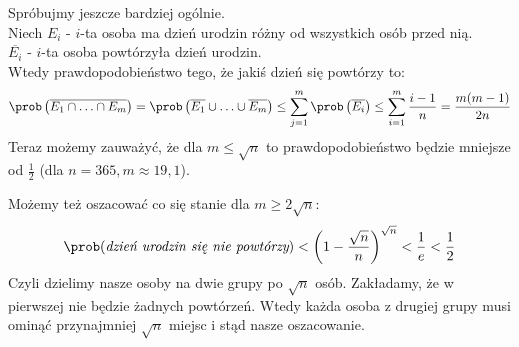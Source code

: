 \begin{example}
	Spróbujmy jeszcze bardziej ogólnie.\\
	Niech \( E_i \) - \(i\)-ta osoba ma dzień urodzin różny od wszystkich osób przed nią.\\
	\( \overline{E_i} \) - \(i\)-ta osoba powtórzyła dzień urodzin.\\
	Wtedy prawdopodobieństwo tego, że jakiś dzień się powtórzy to:
	\[
		\prob\left( \overline{E_1 \cap \ldots \cap E_m } \right) = \prob\left( \overline{E_1} \cup \ldots \cup \overline{E_m} \right) \leq \sum_{j = 1}^{m}\prob\left( \overline{E_i} \right) \leq \sum_{i = 1}^{m}\frac{i-1}{n} = \frac{m(m-1)}{2n}
	\]
	Teraz możemy zauważyć, że dla \( m \leq \sqrt{n} \) to prawdopodobieństwo będzie mniejsze od \( \frac{1}{2} \) (dla \( n = 365, m \approx 19,1 \)).

	Możemy też oszacować co się stanie dla \( m \geq 2\sqrt{n} \):
	\[
		\prob(\textit{dzień urodzin się nie powtórzy}) < \left( 1 - \frac{\sqrt{n}}{n} \right)^{\sqrt{n}} < \frac{1}{e} < \frac{1}{2}
	\]
	Czyli dzielimy nasze osoby na dwie grupy po \(\sqrt{n}\) osób. Zakładamy, że w pierwszej nie będzie żadnych powtórzeń. Wtedy każda osoba z drugiej grupy musi ominąć przynajmniej \(\sqrt{n}\) miejsc i stąd nasze oszacowanie.
\end{example}
